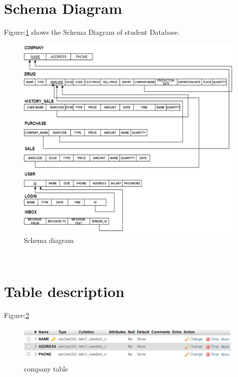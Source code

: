 \documentclass[12pt, letter paper]{report}
\begin{document}
\section{Schema Diagram} 
Figure:\ref{fig:DBMS-Schema.png} shows the Schema Diagram of student Database.
\begin{figure}[h]
 \centering
 \includegraphics[width=1\textwidth]{DBMS-Schema.png}
 \caption{Schema diagram}
 \label{fig:DBMS-Schema.png}
\end{figure}
\\
\pagebreak
\section{Table description} 
\begin{center}
Figure:\ref{fig:company.png} 
\begin{figure}[h]
	\centering
	\includegraphics[width=1\textwidth]{company.png}
	\caption{company table}
	\label{fig:company.png}
\end{figure}
\end{center}
\end{document}
